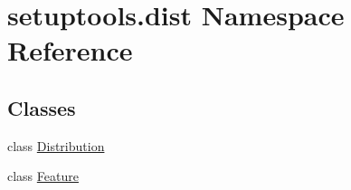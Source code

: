 \hypertarget{namespacesetuptools_1_1dist}{}\section{setuptools.\+dist Namespace Reference}
\label{namespacesetuptools_1_1dist}
\subsection*{Classes}
\begin{DoxyCompactItemize}
\item 
class \hyperlink{classsetuptools_1_1dist_1_1_distribution}{Distribution}
\item 
class \hyperlink{classsetuptools_1_1dist_1_1_feature}{Feature}
\end{DoxyCompactItemize}
